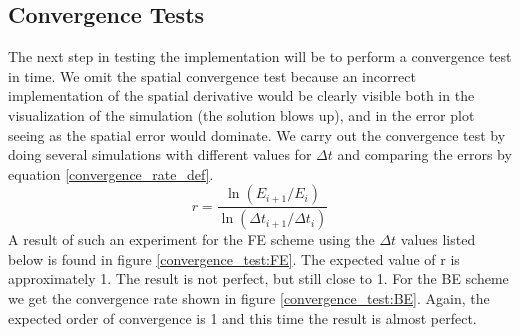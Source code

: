 \subsection{Convergence Tests}

The next step in testing the implementation will be to perform a convergence test in time. 
We omit the spatial convergence test because an incorrect implementation of the spatial derivative would be clearly visible both in the visualization of the simulation (the solution blows up), and in the error plot seeing as the spatial error would dominate.
We carry out the convergence test by doing several simulations with different values for $\Delta t$ and comparing the errors by equation \ref{convergence_rate_def}. 
\begin{equation}\label{convergence_rate_def}
 r = \frac{\ln(E_{i+1}/E_i)}{\ln(\Delta t_{i+1}/\Delta t_i)}
\end{equation}
A result of such an experiment for the FE scheme using the $\Delta t$ values listed below is found in figure \ref{convergence_test:FE}. 
The expected value of r is approximately 1. The result is not perfect, but still close to 1. 
For the BE scheme we get the convergence rate shown in figure \ref{convergence_test:BE}. Again, the expected order of convergence is 1 and this time the result is almost perfect.



